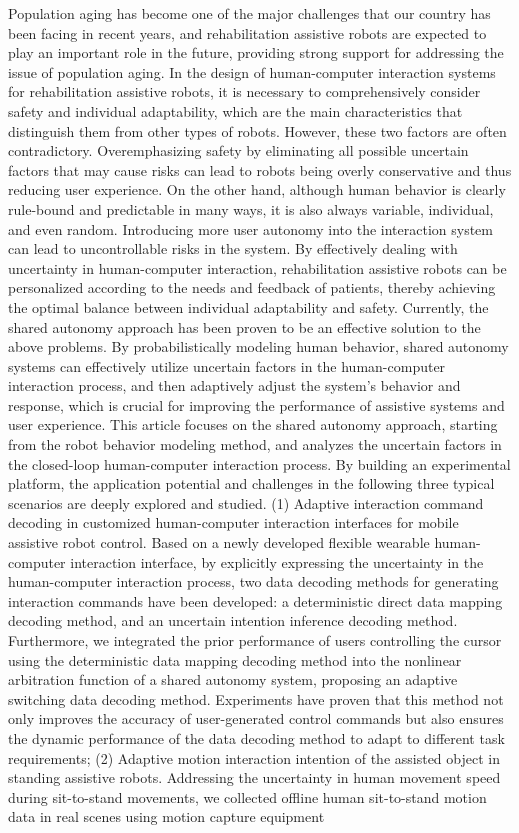 \begin{abstract*}
Population aging has become one of the major challenges that our country has been facing in recent years, and rehabilitation assistive robots are expected to play an important role in the future, providing strong support for addressing the issue of population aging. In the design of human-computer interaction systems for rehabilitation assistive robots, it is necessary to comprehensively consider safety and individual adaptability, which are the main characteristics that distinguish them from other types of robots. However, these two factors are often contradictory. Overemphasizing safety by eliminating all possible uncertain factors that may cause risks can lead to robots being overly conservative and thus reducing user experience. On the other hand, although human behavior is clearly rule-bound and predictable in many ways, it is also always variable, individual, and even random. Introducing more user autonomy into the interaction system can lead to uncontrollable risks in the system. By effectively dealing with uncertainty in human-computer interaction, rehabilitation assistive robots can be personalized according to the needs and feedback of patients, thereby achieving the optimal balance between individual adaptability and safety. Currently, the shared autonomy approach has been proven to be an effective solution to the above problems. By probabilistically modeling human behavior, shared autonomy systems can effectively utilize uncertain factors in the human-computer interaction process, and then adaptively adjust the system's behavior and response, which is crucial for improving the performance of assistive systems and user experience. This article focuses on the shared autonomy approach, starting from the robot behavior modeling method, and analyzes the uncertain factors in the closed-loop human-computer interaction process. By building an experimental platform, the application potential and challenges in the following three typical scenarios are deeply explored and studied. (1) Adaptive interaction command decoding in customized human-computer interaction interfaces for mobile assistive robot control. Based on a newly developed flexible wearable human-computer interaction interface, by explicitly expressing the uncertainty in the human-computer interaction process, two data decoding methods for generating interaction commands have been developed: a deterministic direct data mapping decoding method, and an uncertain intention inference decoding method. Furthermore, we integrated the prior performance of users controlling the cursor using the deterministic data mapping decoding method into the nonlinear arbitration function of a shared autonomy system, proposing an adaptive switching data decoding method. Experiments have proven that this method not only improves the accuracy of user-generated control commands but also ensures the dynamic performance of the data decoding method to adapt to different task requirements; (2) Adaptive motion interaction intention of the assisted object in standing assistive robots. Addressing the uncertainty in human movement speed during sit-to-stand movements, we collected offline human sit-to-stand motion data in real scenes using motion capture equipment 
\end{abstract*}

